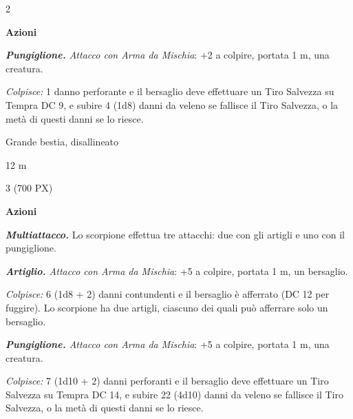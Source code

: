 \begin{multicols}{2}
{\textbf{Azioni}

\emph{\textbf{Pungiglione.} Attacco con Arma da Mischia}: +2 a colpire, portata 1 m, una creatura.

\emph{Colpisce:} 1 danno perforante e il bersaglio deve effettuare un Tiro Salvezza su Tempra DC 9, e subire 4 (1d8) danni da veleno se fallisce il Tiro Salvezza, o la metà di questi danni se lo riesce.

\begin{description}[noitemsep, topsep=0pt, parsep=0pt, partopsep=0pt, itemsep=1pt, leftmargin=2.35cm,  labelwidth=2.2cm, itemindent=0cm, listparindent=0pt] %
\setlength{\baselineskip}{10pt}
\item[\textbf{Taglia/Tipo}] Grande bestia, disallineato
\item[\textbf{Caratt.}] 
\item[\textbf{Punti Ferita}] 
\item[\textbf{Tiri Salvez.}] 
\item[\textbf{Movimento}] 12 m
\item[\textbf{Sfida}] 3 (700 PX)
\end{description}
\smallskip

\textbf{Azioni}

\emph{\textbf{Multiattacco.}} Lo scorpione effettua tre attacchi: due con gli artigli e uno con il pungiglione.

\emph{\textbf{Artiglio.} Attacco con Arma da Mischia}: +5 a colpire, portata 1 m, un bersaglio.

\emph{Colpisce:} 6 (1d8 + 2) danni contundenti e il bersaglio è afferrato (DC 12 per fuggire). Lo scorpione ha due artigli, ciascuno dei quali può afferrare solo un bersaglio.

\emph{\textbf{Pungiglione.} Attacco con Arma da Mischia}: +5 a colpire, portata 1 m, una creatura.

\emph{Colpisce:} 7 (1d10 + 2) danni perforanti e il bersaglio deve effettuare un Tiro Salvezza su Tempra DC 14, e subire 22 (4d10) danni da veleno se fallisce il Tiro Salvezza, o la metà di questi danni se lo riesce.

}
\end{multicols}
